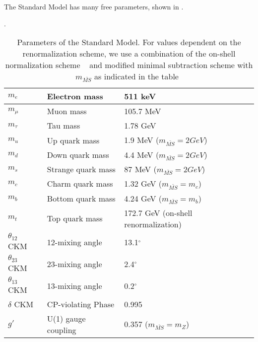 The Standard Model has many free parameters, shown in .
\begin{table}
\centering
\caption{Parameters of the Standard Model.  For values dependent on the renormalization scheme, we use a combination of the on-shell normalization scheme ~\cite{Hollik:1988ii, Bardin:1989vz, Kennedy:1988rt, Sirlin:1980nh} and  modified minimal subtraction scheme with $m_{\bar{MS}}$ as indicated in the table~\cite{ Fanchiotti:1992tu}}.
\label{tab:sm_free_parameters}
\begin{tabular}{| l | l | l |}
\hline
$m_e$             & Electron mass                  & 511 keV                           \\ \hline
$m_\mu$           & Muon mass                      & 105.7 MeV                         \\ \hline
$m_\tau$          & Tau mass                       & 1.78 GeV                          \\ \hline
$m_u$             & Up quark mass                  & 1.9 MeV   ($m_{\bar{MS}} = 2 GeV$)                        \\ \hline
$m_d$             & Down quark mass                & 4.4 MeV   ($m_{\bar{MS}} = 2 GeV$)                       \\ \hline
$m_s$             & Strange quark mass             & 87 MeV    ($m_{\bar{MS}} = 2 GeV$)                        \\ \hline
$m_c$             & Charm quark mass               & 1.32 GeV  ($m_{\bar{MS}} = m_c$)                        \\ \hline
$m_b$             & Bottom quark mass              & 4.24 GeV  ($m_{\bar{MS}} = m_b$)  \\ \hline
$m_t$             & Top quark mass                 & 172.7 GeV (on-shell renormalization)                       \\ \hline
$\theta_{12}$ CKM & 12-mixing angle                & 13.1$^{\circ}$                    \\ \hline
$\theta_{23}$ CKM & 23-mixing angle                & 2.4$^{\circ}$                     \\ \hline
$\theta_{13}$ CKM & 13-mixing angle                & 0.2$^{\circ}$                     \\ \hline
$\delta$ CKM      & CP-violating Phase             & 0.995                             \\ \hline
$g'$              & U(1) gauge coupling            & 0.357     ($m_{\bar{MS}} = m_Z$)                         \\ \hline

\end{tabular}
\end{table}

